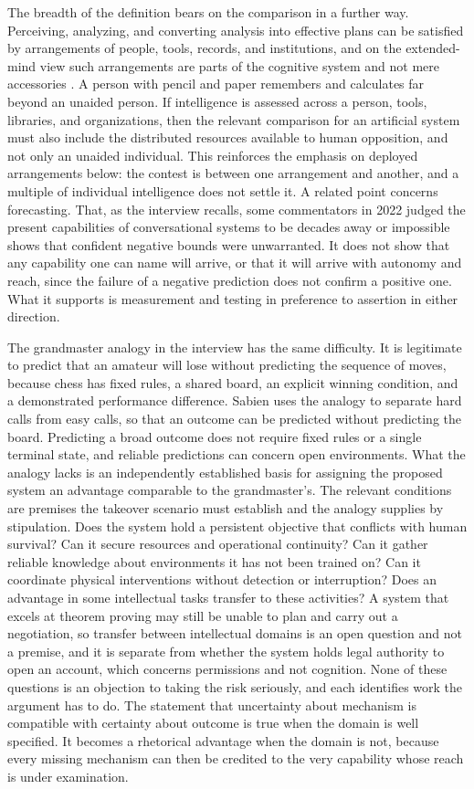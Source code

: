 \documentclass[11pt]{article}
\begin{document}
The breadth of the definition bears on the comparison in a further way. Perceiving, analyzing, and converting analysis into effective plans can be satisfied by arrangements of people, tools, records, and institutions, and on the extended-mind view such arrangements are parts of the cognitive system and not mere accessories \citep{clark1998}. A person with pencil and paper remembers and calculates far beyond an unaided person. If intelligence is assessed across a person, tools, libraries, and organizations, then the relevant comparison for an artificial system must also include the distributed resources available to human opposition, and not only an unaided individual. This reinforces the emphasis on deployed arrangements below: the contest is between one arrangement and another, and a multiple of individual intelligence does not settle it. A related point concerns forecasting. That, as the interview recalls, some commentators in 2022 judged the present capabilities of conversational systems to be decades away or impossible shows that confident negative bounds were unwarranted. It does not show that any capability one can name will arrive, or that it will arrive with autonomy and reach, since the failure of a negative prediction does not confirm a positive one. What it supports is measurement and testing in preference to assertion in either direction.

The grandmaster analogy in the interview has the same difficulty. It is legitimate to predict that an amateur will lose without predicting the sequence of moves, because chess has fixed rules, a shared board, an explicit winning condition, and a demonstrated performance difference. Sabien uses the analogy to separate hard calls from easy calls, so that an outcome can be predicted without predicting the board. Predicting a broad outcome does not require fixed rules or a single terminal state, and reliable predictions can concern open environments. What the analogy lacks is an independently established basis for assigning the proposed system an advantage comparable to the grandmaster's. The relevant conditions are premises the takeover scenario must establish and the analogy supplies by stipulation. Does the system hold a persistent objective that conflicts with human survival? Can it secure resources and operational continuity? Can it gather reliable knowledge about environments it has not been trained on? Can it coordinate physical interventions without detection or interruption? Does an advantage in some intellectual tasks transfer to these activities? A system that excels at theorem proving may still be unable to plan and carry out a negotiation, so transfer between intellectual domains is an open question and not a premise, and it is separate from whether the system holds legal authority to open an account, which concerns permissions and not cognition. None of these questions is an objection to taking the risk seriously, and each identifies work the argument has to do. The statement that uncertainty about mechanism is compatible with certainty about outcome is true when the domain is well specified. It becomes a rhetorical advantage when the domain is not, because every missing mechanism can then be credited to the very capability whose reach is under examination.
\end{document}
